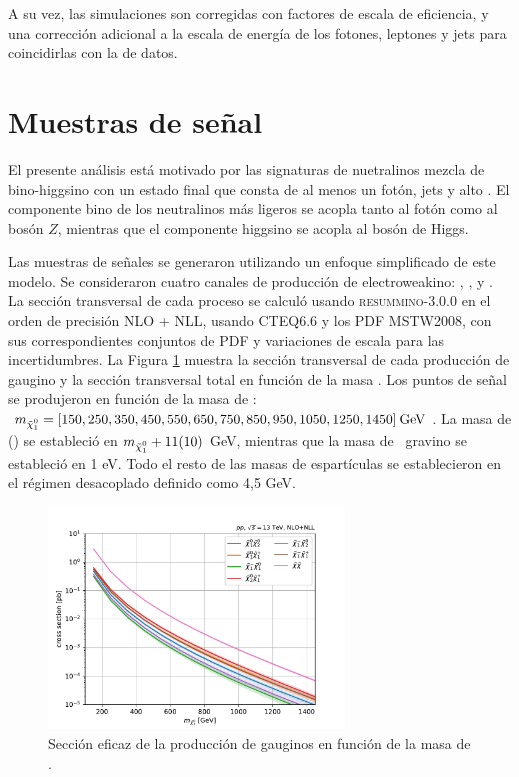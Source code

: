 A su vez, las simulaciones son corregidas con factores de escala de eficiencia, y una corrección adicional a la escala de energía de los fotones, leptones y jets para coincidirlas con la de datos. 


\section{Muestras de señal}

El presente análisis está motivado por las signaturas de nuetralinos mezcla de bino-higgsino
con un estado final que consta de al menos un
fotón, jets y alto \met. El componente bino de los neutralinos más ligeros se acopla tanto al fotón como al bosón $Z$, mientras que el componente higgsino se acopla al bosón de Higgs.

Las muestras de señales se generaron utilizando un enfoque simplificado de este modelo. Se consideraron cuatro canales de producción de electroweakino: \ninoone \ninotwo, \ninoone \chinoonepm, \ninotwo \chinoonepm y \chinoonep \chinoonem. La sección transversal de cada proceso se calculó usando \textsc{resummino-3.0.0} en el orden de precisión NLO + NLL, usando CTEQ6.6 y los PDF MSTW2008, con sus correspondientes conjuntos de PDF y variaciones de escala para las incertidumbres. La Figura \ref{fig:SUSY_xs} muestra la sección transversal de cada producción de gaugino y la sección transversal total en función de la masa \ninoone. Los puntos de señal se produjeron en función de la masa de \ninoone: $m_{\ninoone} = [150, 250, 350, 450, 550, 650, 750, 850, 950, 1050, 1250, 1450] \: \gev$. La masa de \ninotwo (\chinoonepm) se estableció en $m_{\ninoone} + 11 (10)$ GeV, mientras que la masa de \ gravino se estableció en 1 eV. Todo el resto de las masas de espartículas se establecieron en el régimen desacoplado definido como 4,5 GeV.

\begin{figure}
  \centering
  \includegraphics[width=0.7\textwidth]{images/SUSY_EWK_xsecs_m.pdf}
  \caption{Sección eficaz de la producción de gauginos en función de la masa de \ninoone.}
  \label{fig:SUSY_xs}
\end{figure}

